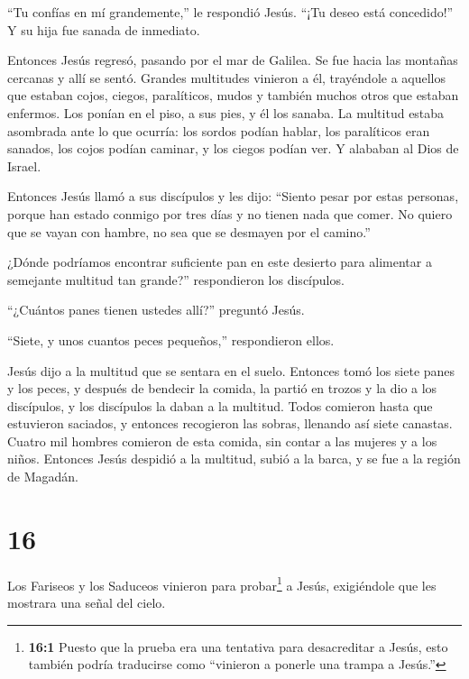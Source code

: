  ``Tu confías en mí grandemente,'' le respondió Jesús.
``¡Tu deseo está concedido!'' Y su hija fue sanada de inmediato.

 Entonces Jesús regresó, pasando por el mar de Galilea. Se
fue hacia las montañas cercanas y allí se sentó.  Grandes
multitudes vinieron a él, trayéndole a aquellos que estaban cojos,
ciegos, paralíticos, mudos y también muchos otros que estaban enfermos.
Los ponían en el piso, a sus pies, y él los sanaba.  La
multitud estaba asombrada ante lo que ocurría: los sordos podían hablar,
los paralíticos eran sanados, los cojos podían caminar, y los ciegos
podían ver. Y alababan al Dios de Israel.

 Entonces Jesús llamó a sus discípulos y les dijo: ``Siento
pesar por estas personas, porque han estado conmigo por tres días y no
tienen nada que comer. No quiero que se vayan con hambre, no sea que se
desmayen por el camino.''

 ¿Dónde podríamos encontrar suficiente pan en este desierto
para alimentar a semejante multitud tan grande?'' respondieron los
discípulos.

 ``¿Cuántos panes tienen ustedes allí?'' preguntó Jesús.

``Siete, y unos cuantos peces pequeños,'' respondieron ellos.

 Jesús dijo a la multitud que se sentara en el suelo.
 Entonces tomó los siete panes y los peces, y después de
bendecir la comida, la partió en trozos y la dio a los discípulos, y los
discípulos la daban a la multitud.  Todos comieron hasta
que estuvieron saciados, y entonces recogieron las sobras, llenando así
siete canastas.  Cuatro mil hombres comieron de esta
comida, sin contar a las mujeres y a los niños.  Entonces
Jesús despidió a la multitud, subió a la barca, y se fue a la región de
Magadán.

\hypertarget{section-15}{%
\section{16}\label{section-15}}

 Los Fariseos y los Saduceos vinieron para probar\footnote{\textbf{16:1}
  Puesto que la prueba era una tentativa para desacreditar a Jesús, esto
  también podría traducirse como ``vinieron a ponerle una trampa a
  Jesús.''} a Jesús, exigiéndole que les mostrara una señal del cielo.

